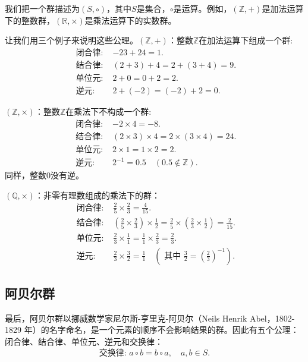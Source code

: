 我们把一个群描述为$(S, \circ)$，其中$S$是集合，$\circ$是运算。例如，$(\mathbb{Z},+)$是加法运算下的整数群，$(\mathbb{R}, \times)$是乘法运算下的实数群。

让我们用三个例子来说明这些公理。$(\mathbb{Z},+)$：整数$\mathbb{Z}$在加法运算下组成一个群:
$$
    \begin{array}{rlr}
        \text { 闭合律: }       & -23+24=1.       \\
        \text { 结合律: } & (2+3)+4=2+(3+4)=9. \\
        \text { 单位元: }      & 2+0=0+2=2.         \\
        \text { 逆元: }       & 2+(-2)=(-2)+2=0.
    \end{array}
$$

$(\mathbb{Z}, \times)$：整数$\mathbb{Z}$在乘法下不构成一个群:
$$
    \begin{array}{rlr}
        \text { 闭合律: }       &-2 \times 4=-8.\\
        \text { 结合律: } &(2 \times 3) \times 4=2 \times(3 \times 4)=24.\\
        \text { 单位元: }      & 2 \times 1=1 \times 2=2.\\
        \text { 逆元: }       &2^{-1}=0.5 \quad(0.5 \notin \mathbb{Z}).
\end{array}
$$
同样，整数0没有逆。

$(\mathbb{Q},\times)$：非零有理数组成的乘法下的群：
$$
    \begin{array}{rlr}
        \text { 闭合律: }       & \frac{2}{5} \times \frac{2}{3}=\frac{4}{15} .                                                                                               \\
        \text { 结合律: } & \left(\frac{2}{5} \times \frac{2}{3}\right) \times \frac{1}{2}=\frac{2}{5} \times\left(\frac{2}{3} \times \frac{1}{2}\right)=\frac{2}{15} . \\
        \text { 单位元: }      & \frac{2}{3} \times \frac{1}{1}=\frac{1}{1} \times \frac{2}{3}=\frac{2}{3} .                                                                 \\
        \text { 逆元: }       & \frac{2}{3} \times \frac{3}{2}=\frac{1}{1} \quad\left(\text { 其中 } \frac{3}{2}=\left(\frac{2}{3}\right)^{-1}\right) .
    \end{array}
$$

\subsection{阿贝尔群}
最后，阿贝尔群以挪威数学家尼尔斯-亨里克-阿贝尔（Neils Henrik Abel，1802-1829 年）的名字命名，是一个元素的顺序不会影响结果的群。因此有五个公理：闭合律、结合律、单位元、逆元和交换律：
$$
    \text { 交换律: } a \circ b=b \circ a, \quad a, b \in S \text {. }
$$

